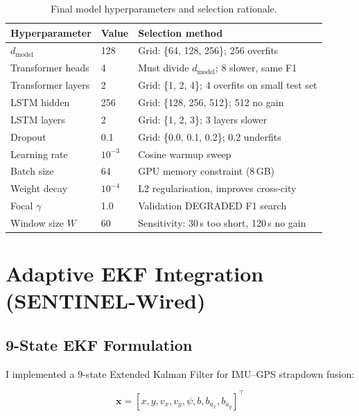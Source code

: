 \documentclass[12pt,a4paper]{article}
\begin{document}
\begin{table}[H]
  \centering
  \caption{Final model hyperparameters and selection rationale.}
  \begin{tabular}{lll}
    \toprule
    \textbf{Hyperparameter} & \textbf{Value} & \textbf{Selection method} \\
    \midrule
    $d_\mathrm{model}$      & 128    & Grid: \{64, 128, 256\}; 256 overfits \\
    Transformer heads       & 4      & Must divide $d_\mathrm{model}$; 8 slower, same F1 \\
    Transformer layers      & 2      & Grid: \{1, 2, 4\}; 4 overfits on small test set \\
    LSTM hidden           & 256    & Grid: \{128, 256, 512\}; 512 no gain \\
    LSTM layers           & 2      & Grid: \{1, 2, 3\}; 3 layers slower \\
    Dropout                 & 0.1    & Grid: \{0.0, 0.1, 0.2\}; 0.2 underfits \\
    Learning rate           & $10^{-3}$ & Cosine warmup sweep \\
    Batch size              & 64     & GPU memory constraint (8\,GB) \\
    Weight decay            & $10^{-4}$ & L2 regularisation, improves cross-city \\
    Focal $\gamma$          & 1.0    & Validation DEGRADED F1 search \\
    Window size $W$         & 60     & Sensitivity: 30\,s too short, 120\,s no gain \\
    \bottomrule
  \end{tabular}
\end{table}

\section{Adaptive EKF Integration (SENTINEL-Wired)}

\subsection{9-State EKF Formulation}

I implemented a 9-state Extended Kalman Filter for IMU--GPS strapdown fusion:

\begin{equation}
  \mathbf{x} = [x, y, v_x, v_y, \psi, b, b_{a_x}, b_{a_y}]^\top
\end{equation}
\end{document}
